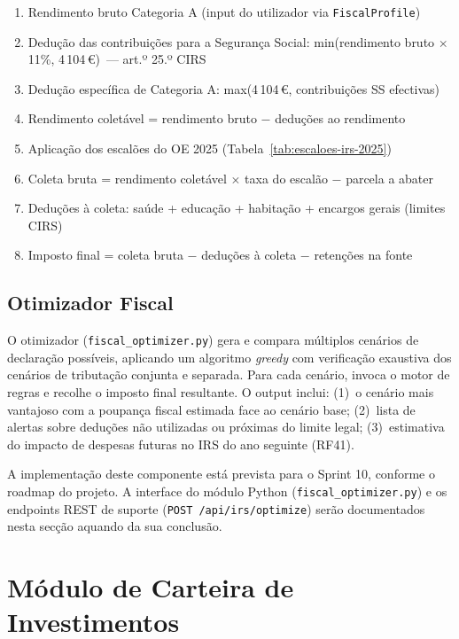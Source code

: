 \begin{enumerate}
    \item Rendimento bruto Categoria A (input do utilizador via \texttt{FiscalProfile})
    \item Dedução das contribuições para a Segurança Social: min(rendimento bruto $\times$ 11\%, 4\,104\,€)~--- art.º 25.º \ac{CIRS}
    \item Dedução específica de Categoria A: max(4\,104\,€, contribuições SS efectivas)
    \item Rendimento coletável = rendimento bruto $-$ deduções ao rendimento
    \item Aplicação dos escalões do OE 2025 (Tabela~\ref{tab:escaloes-irs-2025})
    \item Coleta bruta = rendimento coletável $\times$ taxa do escalão $-$ parcela a abater
    \item Deduções à coleta: saúde + educação + habitação + encargos gerais (limites \ac{CIRS})
    \item Imposto final = coleta bruta $-$ deduções à coleta $-$ retenções na fonte
\end{enumerate}

\subsection{Otimizador Fiscal}
\label{sec:impl-fiscal-optimizer}

O otimizador (\texttt{fiscal\_optimizer.py}) gera e compara múltiplos cenários de declaração possíveis, aplicando um algoritmo \textit{greedy} com verificação exaustiva dos cenários de tributação conjunta e separada. Para cada cenário, invoca o motor de regras e recolhe o imposto final resultante. O output inclui: (1)~o cenário mais vantajoso com a poupança fiscal estimada face ao cenário base; (2)~lista de alertas sobre deduções não utilizadas ou próximas do limite legal; (3)~estimativa do impacto de despesas futuras no \ac{IRS} do ano seguinte (RF41).

A implementação deste componente está prevista para o Sprint 10, conforme o roadmap do projeto. A interface do módulo Python (\texttt{fiscal\_optimizer.py}) e os endpoints REST de suporte (\texttt{POST /api/irs/optimize}) serão documentados nesta secção aquando da sua conclusão.


\section{Módulo de Carteira de Investimentos}
\label{sec:impl-investimentos}

